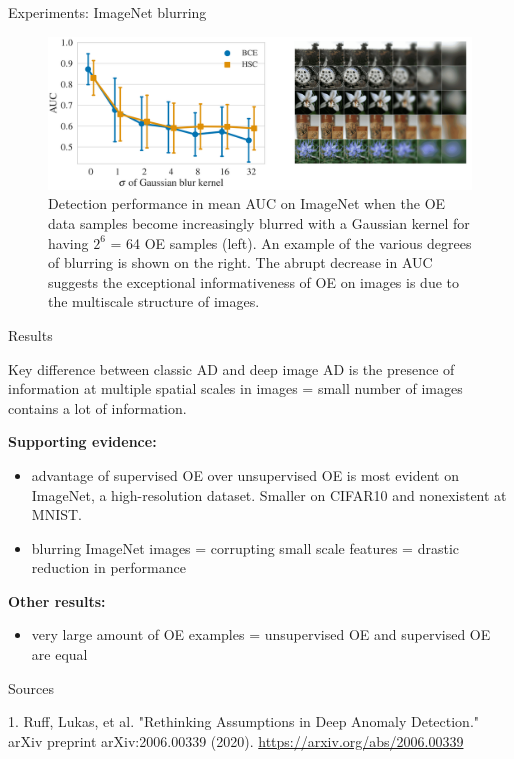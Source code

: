 \documentclass{beamer}
\begin{document}
\begin{frame}{Experiments: ImageNet blurring}
\begin{figure}[h]
\includegraphics[width=\textwidth]{img/gauss}
\caption{Detection performance in mean AUC on ImageNet when the OE data samples become increasingly blurred with a Gaussian kernel for having $2^6$ = 64 OE samples (left). An example of the various degrees of blurring is shown on the right. The abrupt decrease in AUC suggests the exceptional informativeness of OE on images is due to the multiscale structure of images.}
\end{figure}
\end{frame}
\begin{frame}{Results}

Key difference between classic AD and deep image AD is the presence of information at multiple spatial scales in images
= small number of images contains a lot of information.

\vfill

\textbf{Supporting evidence:}
\begin{itemize}
\item advantage of supervised OE over unsupervised OE is most evident on ImageNet, a high-resolution dataset. Smaller on CIFAR10 and nonexistent at MNIST.
\item blurring ImageNet images = corrupting small scale features = drastic reduction in performance  
\end{itemize}

\vfill

\textbf{Other results:}
\begin{itemize}
\item very large amount of OE examples = unsupervised OE and supervised OE are equal
\end{itemize}

\end{frame}
\begin{frame}{Sources}
\begin{thebibliography}{0}

   1. Ruff, Lukas, et al. "Rethinking Assumptions in Deep Anomaly Detection." arXiv preprint arXiv:2006.00339 (2020). \url{https://arxiv.org/abs/2006.00339} 
  
\end{thebibliography}

\end{frame}

 
\end{document}

